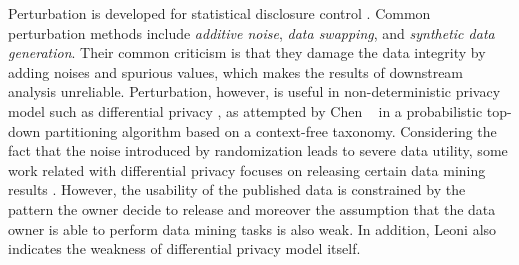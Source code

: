 Perturbation is developed for statistical disclosure control
\cite{FungWCY10:Survey}. Common perturbation methods include {\em additive
noise}, {\em data swapping}, and {\em synthetic data generation}. Their
common criticism is that they damage the data integrity by adding noises and
spurious values, which makes the results of downstream analysis unreliable.
Perturbation, however, is useful in non-deterministic privacy model such as
differential privacy \cite{Dwork:2006:diff, Dwork08:diff:survey}, as
attempted by Chen \etal~ \cite{ChenMFDX11:Diff} in a probabilistic top-down
partitioning algorithm based on a context-free taxonomy.
Considering the fact that the noise introduced by randomization leads to
severe data utility, some work related with differential privacy focuses on
releasing certain data mining results
\cite{Barak:2007:PAC:1265530.1265569,Bhaskar:2010:DFP:1835804.1835869,
Friedman:2010:DMD:1835804.1835868,Korolova:2009:RSQ:1526709.1526733}.
However, the usability of the published data is constrained by the pattern
the owner decide to release and moreover the assumption that the data owner
is able to perform data mining tasks is also weak. In addition, Leoni \etal
\cite{DBLP:journals/corr/abs-1205-2726} also indicates the weakness of
differential privacy model itself.
%



